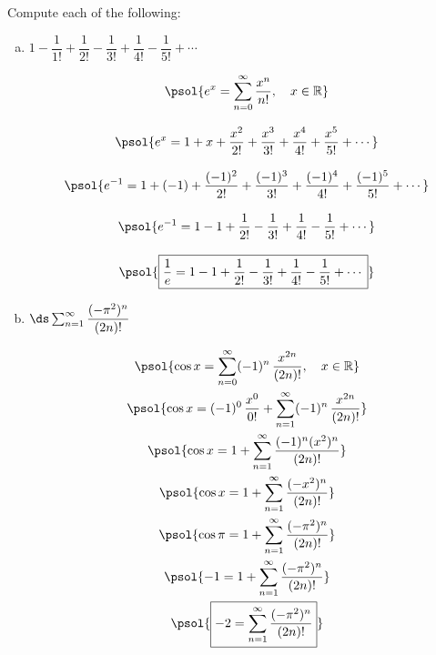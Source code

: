 \documentclass[12pt,letterpaper]{exam}
\begin{document}
\begin{questions}
\newpage
\question[16] Compute each of the following: \par\vspace{0.3cm}
	\begin{enumerate}[(a)]
	\item $1 - \dfrac{1}{1!} + \dfrac{1}{2!} - \dfrac{1}{3!} + \dfrac{1}{4!} - \dfrac{1}{5!} + \cdots$ \par\vspace{0.3cm}
		\[
		\begin{gathered}
		\psol{e^x= \sum_{n=0}^\infty \dfrac{x^n}{n!}, \quad x \in \mathbb{R}} \\[0.3cm]
		\psol{e^x= 1 + x + \dfrac{x^2}{2!} + \dfrac{x^3}{3!} + \dfrac{x^4}{4!} + \dfrac{x^5}{5!} + \cdots} \\[0.3cm]
		\psol{e^{-1}= 1 + (-1) + \dfrac{(-1)^2}{2!} + \dfrac{(-1)^3}{3!} + \dfrac{(-1)^4}{4!} + \dfrac{(-1)^5}{5!} + \cdots} \\[0.3cm]
		\psol{e^{-1}= 1 - 1 + \dfrac{1}{2!} - \dfrac{1}{3!} + \dfrac{1}{4!} - \dfrac{1}{5!} + \cdots} \\[0.3cm]
		\psol{\boxed{\dfrac{1}{e}= 1 - 1 + \dfrac{1}{2!} - \dfrac{1}{3!} + \dfrac{1}{4!} - \dfrac{1}{5!} + \cdots}}
		\end{gathered}
		\] \par\vspace{2.25cm}
	
	\item $\ds\sum_{n=1}^\infty \dfrac{(-\pi^2)^n}{(2n)!}$ \par\vspace{0.3cm}
		\[
		\begin{gathered}
		\psol{\cos x= \sum_{n=0}^\infty (-1)^n \, \dfrac{x^{2n}}{(2n)!}, \quad x \in \mathbb{R}} \\
		\psol{\cos x= (-1)^0 \, \dfrac{x^{0}}{0!} + \sum_{n=1}^\infty (-1)^n \, \dfrac{x^{2n}}{(2n)!}} \\
		\psol{\cos x= 1 + \sum_{n=1}^\infty \dfrac{(-1)^n (x^2)^n}{(2n)!}} \\ 
		\psol{\cos x= 1 + \sum_{n=1}^\infty \dfrac{(-x^2)^n}{(2n)!}} \\ 
		\psol{\cos \pi= 1 + \sum_{n=1}^\infty \dfrac{(-\pi^2)^n}{(2n)!}} \\ 
		\psol{-1= 1 + \sum_{n=1}^\infty \dfrac{(-\pi^2)^n}{(2n)!}} \\
		\psol{\boxed{-2= \sum_{n=1}^\infty \dfrac{(-\pi^2)^n}{(2n)!}}}
		\end{gathered}
		\]
	
	\newpage
	

\end{enumerate}
\end{questions}
\end{document}
